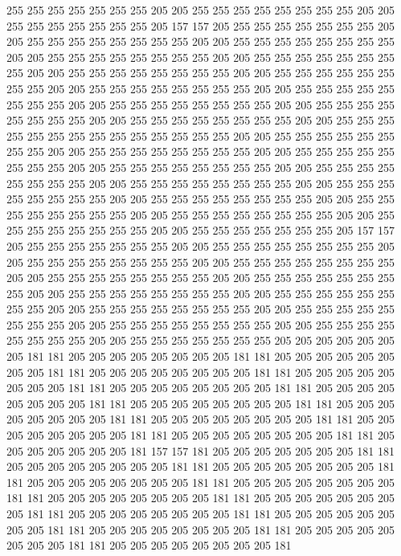 255 255 255 255 255 255 255 205 205 255 255 255 255 255 255 255 255 205 205 255
255 255 255 255 255 255 205 157 157 205 255 255 255 255 255 255 255 205 205 255
255 255 255 255 255 255 255 205 205 255 255 255 255 255 255 255 255 205 205 255
255 255 255 255 255 255 255 205 205 255 255 255 255 255 255 255 255 205 205 255
255 255 255 255 255 255 255 205 205 255 255 255 255 255 255 255 255 205 205 255
255 255 255 255 255 255 255 205 205 255 255 255 255 255 255 255 255 205 205 255
255 255 255 255 255 255 255 205 205 255 255 255 255 255 255 255 255 205 205 255
255 255 255 255 255 255 255 205 205 255 255 255 255 255 255 255 255 255 255 255
255 255 255 205 205 255 255 255 255 255 255 255 255 205 205 255 255 255 255 255
255 255 255 205 205 255 255 255 255 255 255 255 255 205 205 255 255 255 255 255
255 255 255 205 205 255 255 255 255 255 255 255 255 205 205 255 255 255 255 255
255 255 255 205 205 255 255 255 255 255 255 255 255 205 205 255 255 255 255 255
255 255 255 205 205 255 255 255 255 255 255 255 255 205 205 255 255 255 255 255
255 255 255 205 205 255 255 255 255 255 255 255 255 205 205 255 255 255 255 255
255 255 205 157 157 205 255 255 255 255 255 255 255 205 205 255 255 255 255 255
255 255 255 205 205 255 255 255 255 255 255 255 255 205 205 255 255 255 255 255
255 255 255 205 205 255 255 255 255 255 255 255 255 205 205 255 255 255 255 255
255 255 255 205 205 255 255 255 255 255 255 255 255 205 205 255 255 255 255 255
255 255 255 205 205 255 255 255 255 255 255 255 255 205 205 255 255 255 255 255
255 255 255 205 205 255 255 255 255 255 255 255 255 205 205 255 255 255 255 255
255 255 255 205 205 255 255 255 255 255 255 255 205 205 205 205 205 205 205 181
181 205 205 205 205 205 205 205 205 181 181 205 205 205 205 205 205 205 205 181
181 205 205 205 205 205 205 205 205 181 181 205 205 205 205 205 205 205 205 181
181 205 205 205 205 205 205 205 205 181 181 205 205 205 205 205 205 205 205 181
181 205 205 205 205 205 205 205 205 181 181 205 205 205 205 205 205 205 205 181
181 205 205 205 205 205 205 205 205 181 181 205 205 205 205 205 205 205 205 181
181 205 205 205 205 205 205 205 205 181 181 205 205 205 205 205 205 205 181 157
157 181 205 205 205 205 205 205 205 181 181 205 205 205 205 205 205 205 205 181
181 205 205 205 205 205 205 205 205 181 181 205 205 205 205 205 205 205 205 181
181 205 205 205 205 205 205 205 205 181 181 205 205 205 205 205 205 205 205 181
181 205 205 205 205 205 205 205 205 181 181 205 205 205 205 205 205 205 205 181
181 205 205 205 205 205 205 205 205 181 181 205 205 205 205 205 205 205 205 181
181 205 205 205 205 205 205 205 205 181 181 205 205 205 205 205 205 205 205 181
